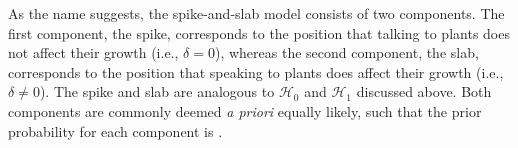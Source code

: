\documentclass[a4paper]{article}
\newcommand{\hypo}[1]{\ensuremath{\mathcal{H}_{#1}}}
\newenvironment{revision}{\color{black}}{\color{black}}
\begin{document}
\begin{revision}As the name suggests, the spike-and-slab model consists of two components. The first component, the spike, \end{revision}corresponds to the position that talking to plants does not affect their growth (i.e., $\delta = 0$), whereas the second component\begin{revision}, the slab, \end{revision}corresponds to the position that speaking to plants does affect their growth (i.e., $\delta \neq 0$).
\begin{revision}%
The spike and slab are analogous to \hypo{0} and \hypo{1} discussed above.
\end{revision}%
Both components are commonly deemed \emph{a priori} equally likely, such that the prior probability for each component is .
\end{document}
